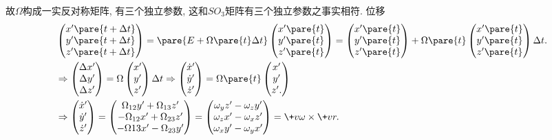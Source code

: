 \documentclass[../LectureNotes.tex]{subfiles}
\begin{document}
故$\Omega$构成一实反对称矩阵, 有三个独立参数, 这和$SO_3$矩阵有三个独立参数之事实相符. 位移
\begin{align*}
    & \begin{pmatrix}
        x'\pare{t+\Delta t} \\
        y'\pare{t+\Delta t} \\
        z'\pare{t+\Delta t}
    \end{pmatrix} = \pare{E + \Omega\pare{t}\Delta t} \begin{pmatrix}
        x'\pare{t} \\ y'\pare{t} \\ z'\pare{t}
    \end{pmatrix} 
    = \begin{pmatrix}
        x'\pare{t} \\ y'\pare{t} \\ z'\pare{t}
    \end{pmatrix} + \Omega\pare{t} \begin{pmatrix}
        x'\pare{t} \\ y'\pare{t} \\ z'\pare{t}
    \end{pmatrix}\Delta t. \\
    & \Rightarrow \begin{pmatrix}
        \Delta x' \\ \Delta y' \\ \Delta z'
    \end{pmatrix} = \Omega \begin{pmatrix}
        x' \\ y' \\ z'
    \end{pmatrix}\Delta t 
    \Rightarrow \begin{pmatrix}
        \dot{x}' \\ \dot{y}' \\ \dot{z}'
    \end{pmatrix} = \Omega\pare{t}\begin{pmatrix}
        x' \\ y' \\ z'.
    \end{pmatrix} \\
    & \Rightarrow  \begin{pmatrix}
        \dot{x}' \\ \dot{y}' \\ \dot{z}'
    \end{pmatrix} = \begin{pmatrix}
        \Omega_{12} y' + \Omega_{13} z' \\
        -\Omega_{12}x' + \Omega_{23} z' \\
        -\Omega{13} x' - \Omega_{23} y'
    \end{pmatrix} = \begin{pmatrix}
        \omega_y z' - \omega_z y' \\
        \omega_z x' - \omega_x z' \\
        \omega_x y' - \omega_y x'
    \end{pmatrix} = \+v\omega\times\+vr.
\end{align*}
\end{document}

